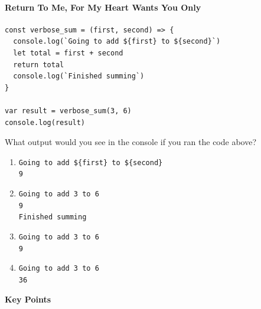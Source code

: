 \paragraph{Return To Me, For My Heart Wants You
Only}\label{return-to-me-for-my-heart-wants-you-only}

\begin{verbatim}
const verbose_sum = (first, second) => {
  console.log(`Going to add ${first} to ${second}`)
  let total = first + second
  return total
  console.log(`Finished summing`)
}

var result = verbose_sum(3, 6)
console.log(result)
\end{verbatim}

What output would you see in the console if you ran the code above?

\begin{enumerate}
\tightlist
\item
  \texttt{Going\ to\ add\ \$\{first\}\ to\ \$\{second\}}\\
  \texttt{9}
\item
  \texttt{Going\ to\ add\ 3\ to\ 6}\\
  \texttt{9}\\
  \texttt{Finished\ summing}
\item
  \texttt{Going\ to\ add\ 3\ to\ 6}\\
  \texttt{9}
\item
  \texttt{Going\ to\ add\ 3\ to\ 6}\\
  \texttt{36}
\end{enumerate}

\textbf{Key Points}

